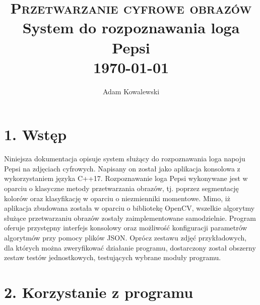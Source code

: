 \documentclass[11pt,a4paper,twoside]{report}
\begin{document}
\title{ \textsc{Przetwarzanie cyfrowe obrazów} \\ [1.0cm]
		\LARGE \textbf{System do rozpoznawania loga Pepsi} \\ [1.0cm]
		\normalsize \today}
\date{}
\author{Adam Kowalewski}
\maketitle

\section*{1. Wstęp}

	Niniejsza dokumentacja opisuje system służący do rozpoznawania loga napoju Pepsi na zdjęciach cyfrowych. Napisany on został jako aplikacja konsolowa z wykorzystaniem języka C++17. Rozpoznawanie loga Pepsi wykonywane jest w oparciu o klasyczne metody przetwarzania obrazów, tj. poprzez segmentację kolorów oraz klasyfikację w oparciu o niezmienniki momentowe. Mimo, iż aplikacja zbudowana została w oparciu o bibliotekę OpenCV, wszelkie algorytmy służące przetwarzaniu obrazów zostały zaimplementowane samodzielnie. Program oferuje przystępny interfejs konsolowy oraz możliwość konfiguracji parametrów algorytmów przy pomocy plików JSON. Oprócz zestawu zdjęć przykładowych, dla których można zweryfikować działanie programu, dostarczony został obszerny zestaw testów jednostkowych, testujących wybrane moduły programu.

\section*{2. Korzystanie z programu}
\end{document}
